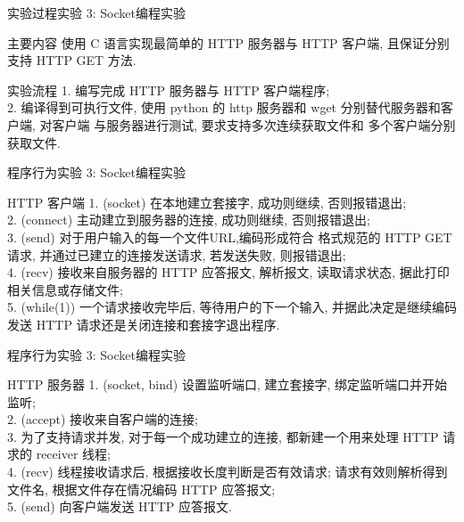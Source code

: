 \documentclass{beamer}
\begin{document}
\begin{frame}{实验过程}{实验 3: Socket编程实验}
    \begin{block}{主要内容}
        使用 C 语言实现最简单的 HTTP 服务器与 HTTP
        客户端, 且保证分别支持 HTTP GET 方法.
    \end{block}
    \begin{block}{实验流程}
        1. 编写完成 HTTP 服务器与 HTTP 客户端程序;\\
        2. 编译得到可执行文件, 使用 python 的 http
        服务器和 wget 分别替代服务器和客户端, 对客户端
        与服务器进行测试, 要求支持多次连续获取文件和
        多个客户端分别获取文件.
    \end{block}
\end{frame}
\begin{frame}{程序行为}{实验 3: Socket编程实验}
    \begin{block}{HTTP 客户端}
        1. (socket) 在本地建立套接字, 成功则继续,
        否则报错退出;\\
        2. (connect) 主动建立到服务器的连接, 成功则继续,
        否则报错退出;\\
        3. (send) 对于用户输入的每一个文件URL,编码形成符合
        格式规范的 HTTP GET 请求, 并通过已建立的连接发送请求,
        若发送失败, 则报错退出;\\
        4. (recv) 接收来自服务器的 HTTP 应答报文, 解析报文,
        读取请求状态, 据此打印相关信息或存储文件;\\
        5. (while(1)) 一个请求接收完毕后, 等待用户的下一个输入,
        并据此决定是继续编码发送 HTTP 请求还是关闭连接和套接字退出程序.
    \end{block}
\end{frame}
\begin{frame}{程序行为}{实验 3: Socket编程实验}
    \begin{block}{HTTP 服务器}
        1. (socket, bind) 设置监听端口, 建立套接字,
        绑定监听端口并开始监听;\\
        2. (accept) 接收来自客户端的连接;\\
        3. 为了支持请求并发, 对于每一个成功建立的连接,
        都新建一个用来处理 HTTP 请求的 receiver 线程;\\
        4. (recv) 线程接收请求后, 根据接收长度判断是否有效请求;
        请求有效则解析得到文件名, 根据文件存在情况编码
        HTTP 应答报文;\\
        5. (send) 向客户端发送 HTTP 应答报文.
    \end{block}
\end{frame}
\end{document}
